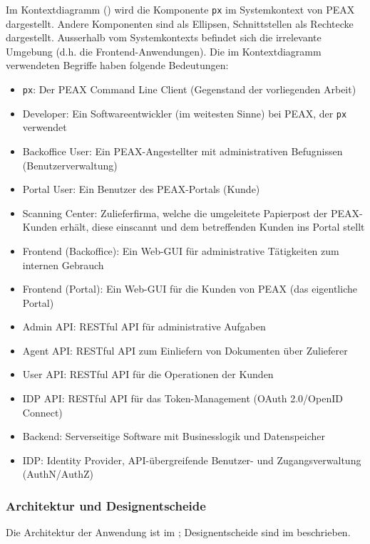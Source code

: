 Im Kontextdiagramm () wird die Komponente \texttt{px} im Systemkontext von PEAX dargestellt. Andere Komponenten sind als Ellipsen, Schnittstellen als Rechtecke dargestellt. Ausserhalb vom Systemkontexts befindet sich die irrelevante Umgebung (d.h. die Frontend-Anwendungen). Die im Kontextdiagramm verwendeten Begriffe haben folgende Bedeutungen:

\begin{itemize}
	\item \texttt{px}: Der PEAX Command Line Client (Gegenstand der vorliegenden Arbeit)
	\item Developer: Ein Softwareentwickler (im weitesten Sinne) bei PEAX, der \texttt{px} verwendet
	\item Backoffice User: Ein PEAX-Angestellter mit administrativen Befugnissen (Benutzerverwaltung)
	\item Portal User: Ein Benutzer des PEAX-Portals (Kunde)
	\item Scanning Center: Zulieferfirma, welche die umgeleitete Papierpost der PEAX-Kunden erhält, diese einscannt und dem betreffenden Kunden ins Portal stellt
	\item Frontend (Backoffice): Ein Web-GUI für administrative Tätigkeiten zum internen Gebrauch
	\item Frontend (Portal): Ein Web-GUI für die Kunden von PEAX (das eigentliche Portal)
	\item Admin API: RESTful API für administrative Aufgaben
	\item Agent API: RESTful API zum Einliefern von Dokumenten über Zulieferer
	\item User API: RESTful API für die Operationen der Kunden
	\item IDP API: RESTful API für das Token-Management (OAuth 2.0/OpenID Connect)
	\item Backend: Serverseitige Software mit Businesslogik und Datenspeicher
	\item IDP: Identity Provider, API-übergreifende Benutzer- und Zugangsverwaltung (AuthN/AuthZ)
\end{itemize}

\subsubsection{Architektur und Designentscheide}

Die Architektur der Anwendung ist im ; Designentscheide sind im  beschrieben.

